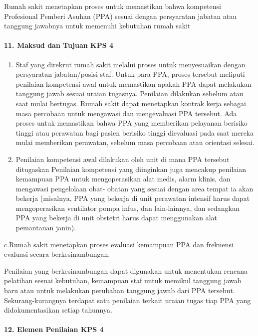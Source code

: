 \documentclass[
]{book}
\begin{document}
Rumah sakit menetapkan proses untuk memastikan bahwa kompetensi Profesional Pemberi Asuhan (PPA) sesuai dengan persyaratan jabatan atau tanggung jawabnya untuk memenuhi kebutuhan rumah sakit

\hypertarget{maksud-dan-tujuan-kps-4}{%
\paragraph*{11. Maksud dan Tujuan KPS 4}\label{maksud-dan-tujuan-kps-4}}

\begin{enumerate}
\def\labelenumi{\alph{enumi}.}
\item
  Staf yang direkrut rumah sakit melalui proses untuk menyesuaikan dengan persyaratan jabatan/posisi staf. Untuk para PPA, proses tersebut meliputi penilaian kompetensi awal untuk memastikan apakah PPA dapat melakukan tanggung jawab sesuai uraian tugasnya. Penilaian dilakukan sebelum atau saat mulai bertugas. Rumah sakit dapat menetapkan kontrak kerja sebagai masa percobaan untuk mengawasi dan mengevaluasi PPA tersebut. Ada proses untuk memastikan bahwa PPA yang memberikan pelayanan berisiko tinggi atau perawatan bagi pasien berisiko tinggi dievaluasi pada saat mereka mulai memberikan perawatan, sebelum masa percobaan atau orientasi selesai.
\item
  Penilaian kompetensi awal dilakukan oleh unit di mana PPA tersebut ditugaskan
  Penilaian kompetensi yang diinginkan juga mencakup penilaian kemampuan PPA untuk mengoperasikan alat medis, alarm klinis, dan mengawasi pengelolaan obat- obatan yang sesuai dengan area tempat ia akan bekerja (misalnya, PPA yang bekerja di unit perawatan intensif harus dapat mengoperasikan ventilator pompa infus, dan lain-lainnya, dan sedangkan PPA yang bekerja di unit obstetri harus dapat menggunakan alat pemantauan janin).
\end{enumerate}

c.Rumah sakit menetapkan proses evaluasi kemampuan PPA dan frekuensi evaluasi secara berkesinambungan.

Penilaian yang berkesinambungan dapat digunakan untuk menentukan rencana pelatihan sesuai kebutuhan, kemampuan staf untuk memikul tanggung jawab baru atau untuk melakukan perubahan tanggung jawab dari PPA tersebut. Sekurang-kurangnya terdapat satu penilaian terkait uraian tugas tiap PPA yang didokumentasikan setiap tahunnya.

\hypertarget{elemen-penilaian-kps-4}{%
\paragraph*{12. Elemen Penilaian KPS 4}\label{elemen-penilaian-kps-4}}
\end{document}
